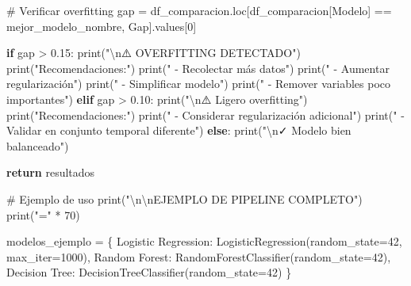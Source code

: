 \documentclass[
  doc,
  floatsintext,
  longtable,
  a4paper,
  nolmodern,
  notxfonts,
  notimes,
  12pt,
  colorlinks=true,linkcolor=blue,citecolor=blue,urlcolor=blue]{apa7}
\newenvironment{Shaded}{\begin{snugshade}}{\end{snugshade}}
\newcommand{\BuiltInTok}[1]{\textcolor[rgb]{0.00,0.23,0.31}{#1}}
\newcommand{\CharTok}[1]{\textcolor[rgb]{0.13,0.47,0.30}{#1}}
\newcommand{\CommentTok}[1]{\textcolor[rgb]{0.37,0.37,0.37}{#1}}
\newcommand{\ControlFlowTok}[1]{\textcolor[rgb]{0.00,0.23,0.31}{\textbf{#1}}}
\newcommand{\DecValTok}[1]{\textcolor[rgb]{0.68,0.00,0.00}{#1}}
\newcommand{\FloatTok}[1]{\textcolor[rgb]{0.68,0.00,0.00}{#1}}
\newcommand{\NormalTok}[1]{\textcolor[rgb]{0.00,0.23,0.31}{#1}}
\newcommand{\OperatorTok}[1]{\textcolor[rgb]{0.37,0.37,0.37}{#1}}
\newcommand{\StringTok}[1]{\textcolor[rgb]{0.13,0.47,0.30}{#1}}
\begin{document}
\begin{Shaded}
\begin{Highlighting}[]
    \CommentTok{\# Verificar overfitting}
\NormalTok{    gap }\OperatorTok{=}\NormalTok{ df\_comparacion.loc[df\_comparacion[}\StringTok{\textquotesingle{}Modelo\textquotesingle{}}\NormalTok{] }\OperatorTok{==}\NormalTok{ mejor\_modelo\_nombre, }\StringTok{\textquotesingle{}Gap\textquotesingle{}}\NormalTok{].values[}\DecValTok{0}\NormalTok{]}
    
    \ControlFlowTok{if}\NormalTok{ gap }\OperatorTok{\textgreater{}} \FloatTok{0.15}\NormalTok{:}
        \BuiltInTok{print}\NormalTok{(}\StringTok{"}\CharTok{\textbackslash{}n}\StringTok{⚠️  OVERFITTING DETECTADO"}\NormalTok{)}
        \BuiltInTok{print}\NormalTok{(}\StringTok{"Recomendaciones:"}\NormalTok{)}
        \BuiltInTok{print}\NormalTok{(}\StringTok{"  {-} Recolectar más datos"}\NormalTok{)}
        \BuiltInTok{print}\NormalTok{(}\StringTok{"  {-} Aumentar regularización"}\NormalTok{)}
        \BuiltInTok{print}\NormalTok{(}\StringTok{"  {-} Simplificar modelo"}\NormalTok{)}
        \BuiltInTok{print}\NormalTok{(}\StringTok{"  {-} Remover variables poco importantes"}\NormalTok{)}
    \ControlFlowTok{elif}\NormalTok{ gap }\OperatorTok{\textgreater{}} \FloatTok{0.10}\NormalTok{:}
        \BuiltInTok{print}\NormalTok{(}\StringTok{"}\CharTok{\textbackslash{}n}\StringTok{⚠️  Ligero overfitting"}\NormalTok{)}
        \BuiltInTok{print}\NormalTok{(}\StringTok{"Recomendaciones:"}\NormalTok{)}
        \BuiltInTok{print}\NormalTok{(}\StringTok{"  {-} Considerar regularización adicional"}\NormalTok{)}
        \BuiltInTok{print}\NormalTok{(}\StringTok{"  {-} Validar en conjunto temporal diferente"}\NormalTok{)}
    \ControlFlowTok{else}\NormalTok{:}
        \BuiltInTok{print}\NormalTok{(}\StringTok{"}\CharTok{\textbackslash{}n}\StringTok{✓ Modelo bien balanceado"}\NormalTok{)}
    
    \ControlFlowTok{return}\NormalTok{ resultados}

\CommentTok{\# Ejemplo de uso}
\BuiltInTok{print}\NormalTok{(}\StringTok{"}\CharTok{\textbackslash{}n\textbackslash{}n}\StringTok{EJEMPLO DE PIPELINE COMPLETO"}\NormalTok{)}
\BuiltInTok{print}\NormalTok{(}\StringTok{"="} \OperatorTok{*} \DecValTok{70}\NormalTok{)}

\NormalTok{modelos\_ejemplo }\OperatorTok{=}\NormalTok{ \{}
    \StringTok{\textquotesingle{}Logistic Regression\textquotesingle{}}\NormalTok{: LogisticRegression(random\_state}\OperatorTok{=}\DecValTok{42}\NormalTok{, max\_iter}\OperatorTok{=}\DecValTok{1000}\NormalTok{),}
    \StringTok{\textquotesingle{}Random Forest\textquotesingle{}}\NormalTok{: RandomForestClassifier(random\_state}\OperatorTok{=}\DecValTok{42}\NormalTok{),}
    \StringTok{\textquotesingle{}Decision Tree\textquotesingle{}}\NormalTok{: DecisionTreeClassifier(random\_state}\OperatorTok{=}\DecValTok{42}\NormalTok{)}
\NormalTok{\}}


\end{Highlighting}
\end{Shaded}
\end{document}
